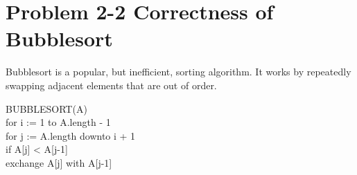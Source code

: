 \documentclass{article}
\newcommand{\?}{\stackrel{?}{=}}
\begin{document}
\section{Problem 2-2 Correctness of Bubblesort}
    Bubblesort is a popular, but inefficient, sorting algorithm.  It works by repeatedly swapping adjacent elements that are out of order.\\
    \setlength{\parindent}{5ex}
    
    \begin{tt}
    	\indent BUBBLESORT(A)\\
    	\indent for i := 1 to A.length - 1\\
    	\indent \indent for j := A.length downto i + 1 \\
    	\indent \indent \indent if A[j] < A[j-1] \\
    	\indent \indent \indent \indent exchange A[j] with A[j-1]
    \end{tt} \\
\end{document}
